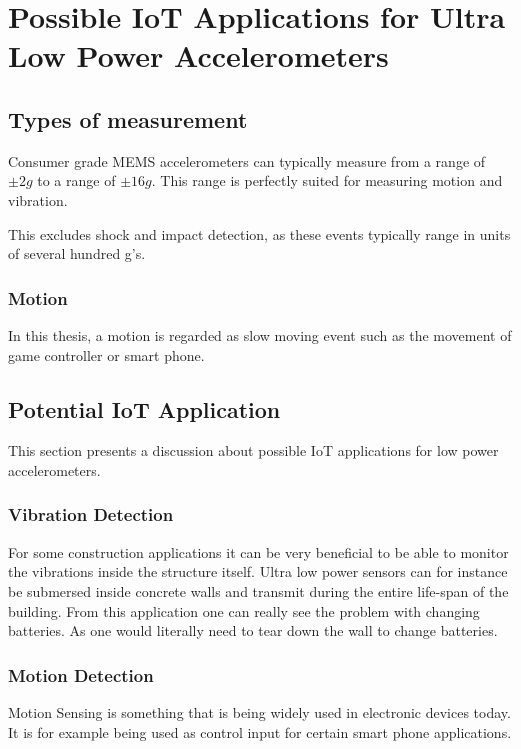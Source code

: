 \chapter{Possible IoT Applications for Ultra Low Power Accelerometers}

\section{Types of measurement}

Consumer grade MEMS accelerometers can typically measure from a range of $\pm2g$ to a range of $\pm16g$. This range is perfectly suited for measuring motion and vibration. 

This excludes shock and impact detection, as these events typically range in units of several hundred g's.

\subsection{Motion}

In this thesis, a motion is regarded as slow moving event such as the movement of game controller or smart phone.

\section{Potential IoT Application}

This section presents a discussion about possible IoT applications for low power accelerometers. 

\subsection{Vibration Detection}

For some construction applications it can be very beneficial to be able to monitor the vibrations inside the structure itself. Ultra low power sensors can for instance be submersed inside concrete walls and transmit during the entire life-span of the building. From this application one can really see the problem with changing batteries. As one would literally need to tear down the wall to change batteries. 

\subsection{Motion Detection}

Motion Sensing is something that is being widely used in electronic devices today. It is for example being used as control input for certain smart phone applications.

